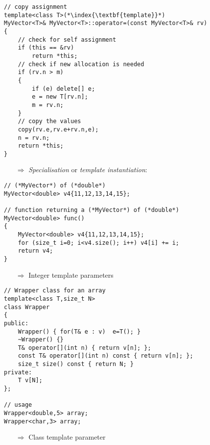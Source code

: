 \documentclass[10pt]{article}
\begin{document}
\begin{lstlisting}
// copy assignment
template<class T>(*\index{\textbf{template}}*)
MyVector<T>& MyVector<T>::operator=(const MyVector<T>& rv)
{
    // check for self assignment
    if (this == &rv)
        return *this;
    // check if new allocation is needed
    if (rv.n > m)
    {
        if (e) delete[] e;
        e = new T[rv.n];
        m = rv.n;
    }
    // copy the values
    copy(rv.e,rv.e+rv.n,e);
    n = rv.n;
    return *this;
}
\end{lstlisting}
\begin{enumerate}
\item[$\Rightarrow$] \emph{Specialisation} or \emph{template instantiation}:
\end{enumerate}
\begin{lstlisting}
// (*MyVector*) of (*double*)
MyVector<double> v4{11,12,13,14,15};

// function returning a (*MyVector*) of (*double*)
MyVector<double> func()
{
    MyVector<double> v4{11,12,13,14,15};
    for (size_t i=0; i<v4.size(); i++) v4[i] += i;
    return v4;
}
\end{lstlisting}
\begin{enumerate}
\item[$\Rightarrow$] Integer template parameters
\end{enumerate}
\begin{lstlisting}
// Wrapper class for an array 
template<class T,size_t N>
class Wrapper
{
public:
    Wrapper() { for(T& e : v)  e=T(); }
    ~Wrapper() {}
    T& operator[](int n) { return v[n]; };
    const T& operator[](int n) const { return v[n]; };
    size_t size() const { return N; }
private:
    T v[N];
};

// usage
Wrapper<double,5> array;
Wrapper<char,3> array;
\end{lstlisting}
\begin{enumerate}
\item[$\Rightarrow$] Class template parameter
\end{enumerate}
\end{document}
